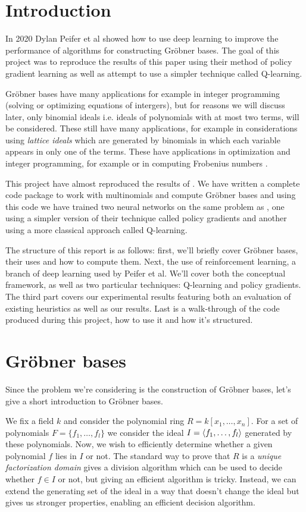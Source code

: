 \documentclass{article}
\theoremstyle{changedot}
\theoremstyle{changedotbreak}
\theoremstyle{nonumberplain}
\DeclarePairedDelimiter{\tuple}{\langle}{\rangle}
\begin{document}
\section{Introduction}
In 2020 Dylan Peifer et al \cite{peifer} showed how to use deep learning to improve the performance of algorithms for constructing Gröbner bases. The goal of this project was to reproduce the results of this paper using their method of policy gradient learning as well as attempt to use a simpler technique called Q-learning.

Gröbner bases have many applications for example in integer programming (solving or optimizing equations of intergers), but for reasons we will discuss later, only binomial ideals i.e. ideals of polynomials with at most two terms, will be considered. These still have many applications, for example in considerations using \emph{lattice ideals} which are generated by binomials in which each variable appears in only one of the terms. These have applications in optimization and integer programming, for example \cite{lattice} or in computing Frobenius numbers \cite{frobenius}.

This project have almost reproduced the results of \cite{peifer}. We have written a complete code package to work with multinomials and compute Gröbner bases and using this code we have trained two neural networks on the same problem as \cite{peifer}, one using a simpler version of their technique called policy gradients and another using a more classical approach called Q-learning. 

The structure of this report is as follows: first, we'll briefly cover Gröbner bases, their uses and how to compute them. Next, the use of reinforcement learning, a branch of deep learning used by Peifer et al. We'll cover both the conceptual framework, as well as two particular techniques: Q-learning and policy gradients. The third part covers our experimental results featuring both an evaluation of existing heuristics as well as our results. Last is a walk-through of the code produced during this project, how to use it and how it's structured.

\section{Gröbner bases}

Since the problem we're considering is the construction of Gröbner bases, let's give a short introduction to Gröbner bases.

We fix a field $k$ and consider the polynomial ring $R = k[x_{1}, \dots, x_{n}]$. For a set of polynomials $F = \{f_{1}, \dots, f_{l}\}$ we consider the ideal $I = \tuple{f_{1}, \dots, f_{l}}$ generated by these polynomials. Now, we wish to efficiently determine whether a given polynomial $f$ lies in $I$ or not. The standard way to prove that $R$ is a \emph{unique factorization domain} gives a division algorithm which can be used to decide whether $f \in I$ or not, but giving an efficient algorithm is tricky. Instead, we can extend the generating set of the ideal in a way that doesn't change the ideal but gives us stronger properties, enabling an efficient decision algorithm.
\end{document}
